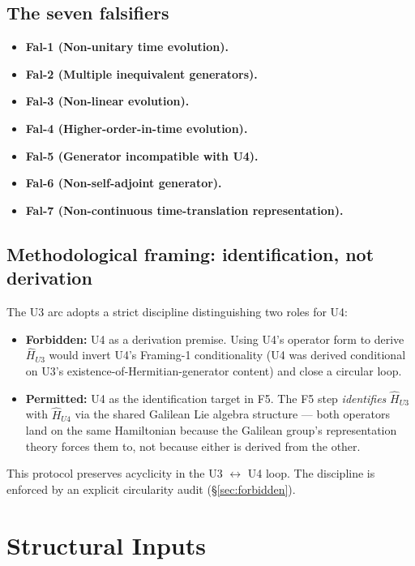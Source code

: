 \documentclass[11pt,a4paper]{article}
\begin{document}
\subsection{The seven falsifiers}

\begin{itemize}
  \item \textbf{Fal-1 (Non-unitary time evolution).}
  \item \textbf{Fal-2 (Multiple inequivalent generators).}
  \item \textbf{Fal-3 (Non-linear evolution).}
  \item \textbf{Fal-4 (Higher-order-in-time evolution).}
  \item \textbf{Fal-5 (Generator incompatible with U4).}
  \item \textbf{Fal-6 (Non-self-adjoint generator).}
  \item \textbf{Fal-7 (Non-continuous time-translation representation).}
\end{itemize}

\subsection{Methodological framing: identification, not derivation}

The U3 arc adopts a strict discipline distinguishing two roles for U4:

\begin{itemize}
  \item \textbf{Forbidden:} U4 as a derivation premise. Using U4's operator form to derive $\hat{H}_{U3}$ would invert U4's Framing-1 conditionality (U4 was derived conditional on U3's existence-of-Hermitian-generator content) and close a circular loop.
  \item \textbf{Permitted:} U4 as the identification target in F5. The F5 step \emph{identifies} $\hat{H}_{U3}$ with $\hat{H}_{U4}$ via the shared Galilean Lie algebra structure --- both operators land on the same Hamiltonian because the Galilean group's representation theory forces them to, not because either is derived from the other.
\end{itemize}

This protocol preserves acyclicity in the U3 $\leftrightarrow$ U4 loop. The discipline is enforced by an explicit circularity audit (\S\ref{sec:forbidden}).

\section{Structural Inputs}\label{sec:inputs}
\end{document}
